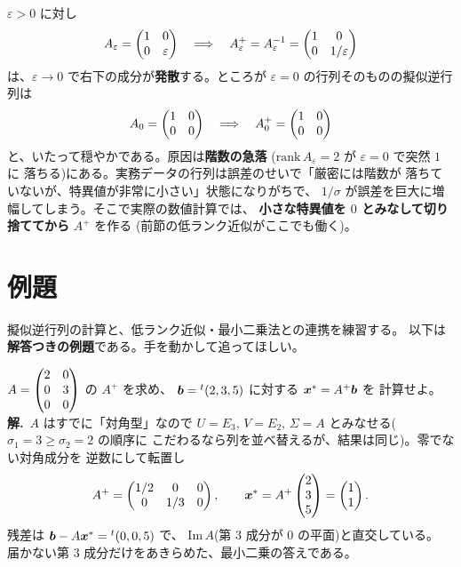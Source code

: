 \begin{hanrei}[擬似逆行列は入力の小さな変化に対して連続でない]\label{hanrei:pinv-discont}
$\varepsilon > 0$ に対し
\[
A_{\varepsilon} = \begin{pmatrix}1 & 0 \\ 0 & \varepsilon\end{pmatrix}
\quad\Longrightarrow\quad
A_{\varepsilon}^{+} = A_{\varepsilon}^{-1}
= \begin{pmatrix}1 & 0 \\ 0 & 1/\varepsilon\end{pmatrix}
\]
は、$\varepsilon \to 0$ で右下の成分が\textbf{発散}する。ところが
$\varepsilon = 0$ の行列そのものの擬似逆行列は
\[
A_0 = \begin{pmatrix}1 & 0 \\ 0 & 0\end{pmatrix}
\quad\Longrightarrow\quad
A_0^{+} = \begin{pmatrix}1 & 0 \\ 0 & 0\end{pmatrix}
\]
と、いたって穏やかである。原因は\textbf{階数の急落}
($\mathrm{rank}\,A_{\varepsilon} = 2$ が $\varepsilon = 0$ で突然 $1$ に
落ちる)にある。実務データの行列は誤差のせいで「厳密には階数が
落ちていないが、特異値が非常に小さい」状態になりがちで、
$1/\sigma$ が誤差を巨大に増幅してしまう。そこで実際の数値計算では、
\textbf{小さな特異値を $0$ とみなして切り捨ててから} $A^{+}$ を作る
(前節の低ランク近似がここでも働く)。
\end{hanrei}

\section{例題}

擬似逆行列の計算と、低ランク近似・最小二乗法との連携を練習する。
以下は\textbf{解答つきの例題}である。手を動かして追ってほしい。

\begin{rei}[例題・基本(対角型の擬似逆行列)]\label{rei:pinv-diag}
$A = \begin{pmatrix}2 & 0 \\ 0 & 3 \\ 0 & 0\end{pmatrix}$ の $A^{+}$ を求め、
$\bm{b} = {}^t(2, 3, 5)$ に対する $\bm{x}^* = A^{+}\bm{b}$ を
計算せよ。\\
\textbf{解.}\ $A$ はすでに「対角型」なので $U = E_3$, $V = E_2$,
$\Sigma = A$ とみなせる($\sigma_1 = 3 \ge \sigma_2 = 2$ の順序に
こだわるなら列を並べ替えるが、結果は同じ)。零でない対角成分を
逆数にして転置し
\[
A^{+} = \begin{pmatrix}1/2 & 0 & 0 \\ 0 & 1/3 & 0\end{pmatrix}, \qquad
\bm{x}^* = A^{+}\begin{pmatrix}2 \\ 3 \\ 5\end{pmatrix} = \begin{pmatrix}1 \\ 1\end{pmatrix}.
\]
残差は $\bm{b} - A\bm{x}^* = {}^t(0, 0, 5)$ で、
$\mathrm{Im}\,A$(第 $3$ 成分が $0$ の平面)と直交している。
届かない第 $3$ 成分だけをあきらめた、最小二乗の答えである。
\end{rei}

